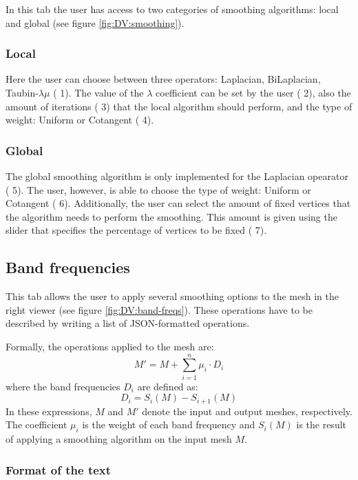 \documentclass[12pt]{article}
\newcommand \elem[1] {{\color{red} #1}}
\begin{document}
In this tab the user has access to two categories of smoothing algorithms:
local and global (see figure \ref{fig:DV:smoothing}).

\subsubsection{Local}
Here the user can choose between three operators: Laplacian, BiLaplacian,
Taubin-$\lambda\mu$ (\elem{1}). The value of the $\lambda$ coefficient
can be set by the user (\elem{2}), also the amount of iterations (\elem{3})
that the local algorithm should perform, and the type of weight: Uniform or Cotangent
(\elem{4}).

\subsubsection{Global}
The global smoothing algorithm is only implemented for the Laplacian
opearator (\elem{5}). The user, however, is able to choose the type of
weight: Uniform or Cotangent (\elem{6}). Additionally, the user can
select the amount of fixed vertices that the algorithm needs to perform
the smoothing. This amount is given using the slider that specifies the
percentage of vertices to be fixed (\elem{7}).

\subsection{Band frequencies}
\label{sec:dual-view:band-frequencies}

This tab allows the user to apply several smoothing options to the mesh
in the right viewer (see figure \ref{fig:DV:band-freqs}). These operations
have to be described by writing a list of JSON-formatted operations.

\hfill

Formally, the operations applied to the mesh are:
\[
M' = M + \sum_{i=1}^n \mu_i \cdot D_i
\]
where the band frequencies $D_i$ are defined as:
\[
D_i = S_i(M) - S_{i + 1}(M)
\]
In these expressions, $M$ and $M'$ denote the input and output meshes,
respectively. The coefficient $\mu_i$ is the weight of each band frequency
and $S_i(M)$ is the result of applying a smoothing algorithm on the input
mesh $M$.

\subsubsection{Format of the text}
\end{document}
